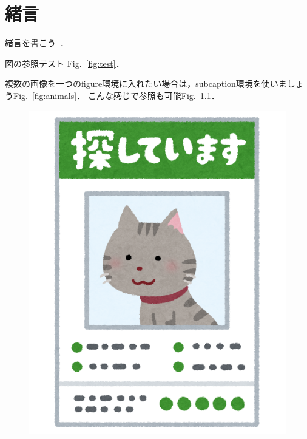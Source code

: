 
\chapter{緒言}
\label{Chapter1}

緒言を書こう~\cite{bibtest}．

図の参照テスト Fig.~\ref{fig:test}．%

複数の画像を一つのfigure環境に入れたい場合は，subcaption環境を使いましょうFig.~\ref{fig:animals}．
こんな感じで参照も可能Fig.~\ref{fig:frog}．

\begin{figure}[tb]
  \begin{minipage}[b]{.5\columnwidth}
   \centering
   \includegraphics[width=\columnwidth]{./figure/cat.png}
   \label{fig:frog}
 \end{minipage}%
 \begin{minipage}[b]{.5\columnwidth}

\end{minipage}
\end{figure}

